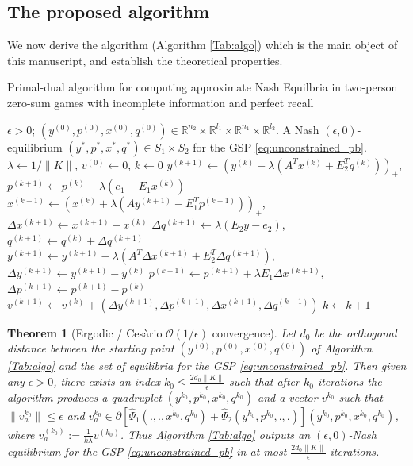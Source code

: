 \documentclass[a4paper,9pt]{extarticle}
\newtheorem{theorem}{Theorem}
\begin{document}
\subsection{The proposed algorithm}
\label{sec:algo}
We now derive the algorithm (Algorithm \ref{Tab:algo}) which is the
  main object of this
manuscript, and establish the theoretical properties.

\begin{algorithm}
\caption{Primal-dual algorithm for computing approximate Nash
  Equilbria in two-person zero-sum games with incomplete information
  and perfect recall}
\label{Tab:algo}
\begin{algorithmic}[1]
\Require $\epsilon > 0$; $(y^{(0)},p^{(0)},x^{(0)},q^{(0)}) \in \mathbb{R}^{n_2}
  \times \mathbb{R}^{l_1} \times \mathbb{R}^{n_1} \times
  \mathbb{R}^{l_2}$.
\Ensure A Nash $(\epsilon,0)$-equilibrium
$({y^*},{p^*},{x^*},{q^*}) \in S_1 \times S_2$ for
the GSP \eqref{eq:unconstrained_pb}.
\State  $\lambda \leftarrow 1/\|K\|$, ${v}^{(0)} \leftarrow 0$, $k
\leftarrow 0$
\State $y^{(k + 1)} \leftarrow (y^{(k)} - \lambda (A^Tx^{(k)} +
E_2^Tq^{(k)}))_+$, \hspace{.5em}$p^{(k+1)} \leftarrow p^{(k)} -
\lambda(e_1-E_1x^{(k)})$
\State $x^{(k + 1)} \leftarrow (x^{(k)} + \lambda (Ay^{(k+1)} -
E_1^Tp^{(k+1)}))_+$, \hspace{.5em}$\Delta x^{(k+1)} \leftarrow
x^{(k+1)}-x^{(k)}$
\State $\Delta q^{(k+1)} \leftarrow \lambda (E_2y -
e_2)$, \hspace{.5em}$q^{(k+1)} \leftarrow q^{(k)} + \Delta q^{(k+1)}$
\State $y^{(k+1)} \leftarrow y^{(k+1)} - \lambda (A^T\Delta x^{(k+1)}
+ E_2^T\Delta q^{(k+1)})$, \hspace{.5em}$\Delta y^{(k+1)} \leftarrow
y^{(k+1)}-y^{(k)}$
\State $p^{(k+1)} \leftarrow p^{(k+1)} + \lambda E_1\Delta x^{(k+1)}$,
\hspace{.5em} $\Delta p^{(k+1)} \leftarrow p^{(k+1)}-p^{(k)}$
\State ${v}^{(k+1)} \leftarrow {v}^{(k)} + (\Delta
y^{(k+1)},\Delta p^{(k+1)},\Delta x^{(k+1)},\Delta q^{(k+1)})$ 
\State $k \leftarrow k + 1$
\EndWhile
\end{algorithmic}
\end{algorithm}

\begin{theorem}[Ergodic / Ces\`ario $\mathcal{O}(1/\epsilon)$ convergence]
Let $d_0$ be the orthogonal distance between the starting point
$(y^{(0)},p^{(0)},x^{(0)},q^{(0)})$ of Algorithm \ref{Tab:algo} and the
set of equilibria for the GSP \eqref{eq:unconstrained_pb}.
Then given any $\epsilon > 0$, there exists an index
$k_0 \le \frac{2d_0\|K\|}{\epsilon}$ such that after $k_0$ iterations
the algorithm produces a quadruplet
$(y^{k_0},p^{k_0},x^{k_0},q^{k_0})$ and a vector $v^{k_0}$ such that
$\|v_a^{k_0}\| \le \epsilon$ and $v_a^{k_0} \in
\partial[\hat{\Psi}_1(., ., x^{k_0}, q^{k_0}) +
  \hat{\Psi}_2(y^{k_0}, p^{k_0}, ., .)](y^{k_0},p^{k_0},x^{k_0},q^{k_0})$,
where $v_a^{(k_0)} := \frac{1}{k\lambda}v^{(k_0)}$.
Thus Algorithm \ref{Tab:algo} outputs an $(\epsilon,0)$-Nash
equilibrium for the GSP \eqref{eq:unconstrained_pb}
in at most $\frac{2d_0\|K\|}{\epsilon}$ iterations.
\end{theorem}
\end{document}
